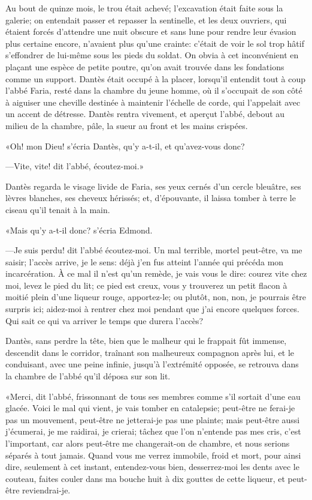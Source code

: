 Au bout de quinze mois, le trou était achevé; l'excavation était faite sous la galerie; on entendait passer et repasser la sentinelle, et les deux ouvriers, qui étaient forcés d'attendre une nuit obscure et sans lune pour rendre leur évasion plus certaine encore, n'avaient plus qu'une crainte: c'était de voir le sol trop hâtif s'effondrer de lui-même sous les pieds du soldat. On obvia à cet inconvénient en plaçant une espèce de petite poutre, qu'on avait trouvée dans les fondations comme un support. Dantès était occupé à la placer, lorsqu'il entendit tout à coup l'abbé Faria, resté dans la chambre du jeune homme, où il s'occupait de son côté à aiguiser une cheville destinée à maintenir l'échelle de corde, qui l'appelait avec un accent de détresse. Dantès rentra vivement, et aperçut l'abbé, debout au milieu de la chambre, pâle, la sueur au front et les mains crispées.

«Oh! mon Dieu! s'écria Dantès, qu'y a-t-il, et qu'avez-vous donc?

—Vite, vite! dit l'abbé, écoutez-moi.»

Dantès regarda le visage livide de Faria, ses yeux cernés d'un cercle bleuâtre, ses lèvres blanches, ses cheveux hérissés; et, d'épouvante, il laissa tomber à terre le ciseau qu'il tenait à la main.

«Mais qu'y a-t-il donc? s'écria Edmond.

—Je suis perdu! dit l'abbé écoutez-moi. Un mal terrible, mortel peut-être, va me saisir; l'accès arrive, je le sens: déjà j'en fus atteint l'année qui précéda mon incarcération. À ce mal il n'est qu'un remède, je vais vous le dire: courez vite chez moi, levez le pied du lit; ce pied est creux, vous y trouverez un petit flacon à moitié plein d'une liqueur rouge, apportez-le; ou plutôt, non, non, je pourrais être surpris ici; aidez-moi à rentrer chez moi pendant que j'ai encore quelques forces. Qui sait ce qui va arriver le temps que durera l'accès?

Dantès, sans perdre la tête, bien que le malheur qui le frappait fût immense, descendit dans le corridor, traînant son malheureux compagnon après lui, et le conduisant, avec une peine infinie, jusqu'à l'extrémité opposée, se retrouva dans la chambre de l'abbé qu'il déposa sur son lit.

«Merci, dit l'abbé, frissonnant de tous ses membres comme s'il sortait d'une eau glacée. Voici le mal qui vient, je vais tomber en catalepsie; peut-être ne ferai-je pas un mouvement, peut-être ne jetterai-je pas une plainte; mais peut-être aussi j'écumerai, je me raidirai, je crierai; tâchez que l'on n'entende pas mes cris, c'est l'important, car alors peut-être me changerait-on de chambre, et nous serions séparés à tout jamais. Quand vous me verrez immobile, froid et mort, pour ainsi dire, seulement à cet instant, entendez-vous bien, desserrez-moi les dents avec le couteau, faites couler dans ma bouche huit à dix gouttes de cette liqueur, et peut-être reviendrai-je.

